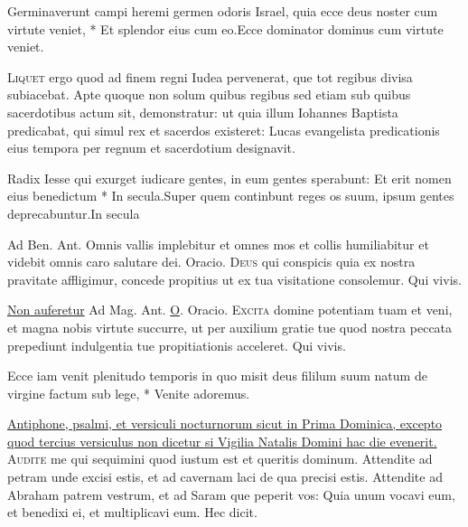 \begin{multicols*}{2}
\begin{responsory}
{Germinaverunt campi heremi germen odoris Israel, quia ecce deus noster cum virtute veniet, * Et splendor eius cum eo.}{Ecce dominator dominus cum virtute veniet.}
\end{responsory}
\lettrine[lines=2]{\zallmancaps \color{Blue} L}{iquet} ergo quod ad finem regni Iudea pervenerat, que tot regibus divisa subiacebat. Apte quoque non solum quibus regibus sed etiam sub quibus sacerdotibus actum sit, demonstratur: ut quia illum Iohannes Baptista predicabat, qui simul rex et sacerdos existeret: Lucas evangelista predicationis eius tempora per regnum et sacerdotium designavit.
\begin{responsory-final}
{Radix Iesse qui exurget iudicare gentes, in eum gentes sperabunt: Et erit nomen eius benedictum * In secula.}{Super quem continbunt reges os suum, ipsum gentes deprecabuntur.}{In secula}
\end{responsory-final}
{\color{Red} Ad Ben. Ant.} Omnis vallis implebitur et omnes mos et collis humiliabitur et videbit omnis caro salutare dei. {\color{Red} Oracio.}
\lettrine[lines=2]{\zallmancaps \color{Red} D}{eus} qui conspicis quia ex nostra pravitate affligimur, concede propitius ut ex tua visitatione consolemur. Qui vivis.
{\color{Red} }
\par {} \R \hyperlink{non-auferetur}{Non auferetur} {\color{Red} Ad Mag. Ant.} \hyperlink{o-antiphons}{O}. {\color{Red} Oracio.}
\lettrine[lines=2]{\zallmancaps \color{Blue} E}{xcita} domine potentiam tuam et veni, et magna nobis virtute succurre, ut per auxilium gratie tue quod nostra peccata prepediunt indulgentia tue propitiationis acceleret. Qui vivis.
\begin{invitatory}
{Ecce iam venit plenitudo temporis in quo misit deus fililum suum natum de virgine factum sub lege, * Venite adoremus.}
\end{invitatory}
\newline \ul{Antiphone, psalmi, et versiculi nocturnorum sicut in Prima Dominica, excepto quod tercius versiculus non dicetur si Vigilia Natalis Domini hac die evenerit.}
\lettrine[lines=2]{\zallmancaps \color{Red} A}{udite} me qui sequimini quod iustum est et queritis dominum. Attendite ad petram unde excisi estis, et ad cavernam laci de qua precisi estis. Attendite ad Abraham patrem vestrum, et ad Saram que peperit vos: Quia unum vocavi eum, et benedixi ei, et multiplicavi eum. Hec dicit.

\end{multicols*}

